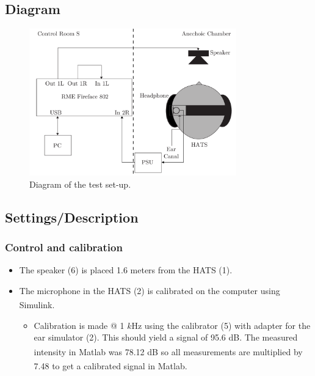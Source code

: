 \subsection{Diagram}
\begin{figure}[H]
	\centering
	\includegraphics[width=0.8\textwidth]{../Journal/Experiments/TestofConsumerHeadphones/OtherBrandsDiagram.pdf}
	\caption{Diagram of the test set-up.}
	\label{OtherBrandsDiagram}
\end{figure}


\subsection{Settings/Description}
\subsubsection{Control and calibration}
\begin{itemize}
	\item The speaker (6) is placed 1.6 meters from the HATS (1).
	\item The microphone in the HATS (2) is calibrated on the computer using Simulink\textsuperscript{\textregistered}.
	\begin{itemize} 
		\item Calibration is made @ 1 $k$Hz using the calibrator (5) with adapter for the ear simulator (2). This should yield a signal of 95.6 dB. The measured intensity in Matlab\textsuperscript{\textregistered} was 78.12 dB so all measurements are multiplied by 7.48 to get a calibrated signal in Matlab\textsuperscript{\textregistered}.
	\end{itemize}
\end{itemize}

